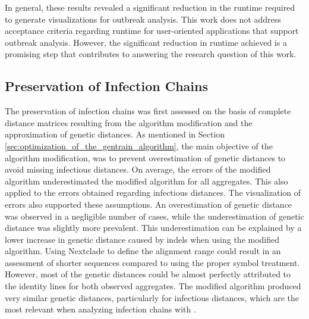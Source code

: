 In general, these results revealed a significant reduction in the runtime required to generate visualizations for outbreak analysis. This work does not address acceptance criteria regarding runtime for user-oriented applications that support outbreak analysis. However, the significant reduction in runtime achieved is a promising step that contributes to answering the research question of this work.

\subsection{Preservation of Infection Chains}
The preservation of infection chains was first assessed on the basis of complete distance matrices resulting from the algorithm modification and the approximation of genetic distances. As mentioned in Section \ref{sec:optimization_of_the_gentrain_algorithm}, the main objective of the algorithm modification, was to prevent overestimation of genetic distances to avoid missing infectious distances. On average, the errors of the modified algorithm underestimated the modified algorithm for all aggregates. This also applied to the errors obtained regarding infectious distances. The visualization of errors also supported these assumptions. An overestimation of genetic distance was observed in a negligible number of cases, while the underestimation of genetic distance was slightly more prevalent. This underestimation can be explained by a lower increase in genetic distance caused by indels when using the modified algorithm. Using Nextclade to define the alignment range could result in an assessment of shorter sequences compared to using the proper symbol treatment.
However, most of the genetic distances could be almost perfectly attributed to the identity lines for both observed aggregates. The modified algorithm produced very similar genetic distances, particularly for infectious distances, which are the most relevant when analyzing infection chains with .

